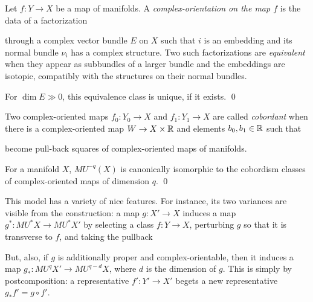 \begin{definition}
Let $f: Y \to X$ be a map of manifolds.  A \textit{complex-orientation on the map $f$} is the data of a factorization
\begin{center}
\end{center}
through a complex vector bundle $E$ on $X$ such that $i$ is an embedding and its normal bundle $\nu_i$ has a complex structure.  Two such factorizations are \textit{equivalent} when they appear as subbundles of a larger bundle and the embeddings are isotopic, compatibly with the structures on their normal bundles.
\end{definition}
\begin{lemma}
For $\dim E \gg 0$, this equivalence class is unique, if it exists. \qed
\end{lemma}
\begin{definition}
Two complex-oriented maps $f_0: Y_0 \to X$ and $f_1: Y_1 \to X$ are called \textit{cobordant} when there is a complex-oriented map $W \to X \times \mathbb R$ and elements $b_0, b_1 \in \mathbb R$ such that
\begin{center}
\end{center}
become pull-back squares of complex-oriented maps of manifolds.
\end{definition}

\begin{theorem}[Thom]
For a manifold $X$, $MU^{-q}(X)$ is canonically isomorphic to the cobordism classes of complex-oriented maps of dimension $q$. \qed
\end{theorem}

\begin{remark}
This model has a variety of nice features.  For instance, its two variances are visible from the construction: a map $g: X' \to X$ induces a map $g^*: MU^* X \to MU^* X'$ by selecting a class $f: Y \to X$, perturbing $g$ so that it is transverse to $f$, and taking the pullback
\begin{center}
\end{center}
But, also, if $g$ is additionally proper and complex-orientable, then it induces a map $g_*: MU^q X' \to MU^{q-d} X$, where $d$ is the dimension of $g$.  This is simply by postcomposition: a representative $f': Y' \to X'$ begets a new representative $g_* f' = g \circ f'$.
\end{remark}


